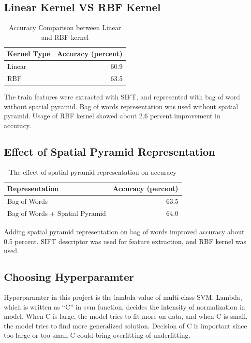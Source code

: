 \subsection*{Linear Kernel VS RBF Kernel}
\begin{table}[h]
    \centering
    \begin{tabular}{lr}
        \toprule
        Kernel Type & Accuracy (percent) \\
        \midrule
        Linear & 60.9 \\
        RBF & 63.5 \\
        \bottomrule
    \end{tabular}
    \caption{Accuracy Comparison between Linear and RBF kernel}
\end{table}
The train features were extracted with SIFT, and represented with bag of word without spatial pyramid. Bag of words representation was used without spatial pyramid. Usage of RBF kernel showed about 2.6 percent improvement in accuracy. 
\subsection*{Effect of Spatial Pyramid Representation}
\begin{table}[h]
    \centering
    \begin{tabular}{lr}
        \toprule
        Representation & Accuracy (percent) \\
        \midrule
        Bag of Words & 63.5 \\
        Bag of Words + Spatial Pyramid & 64.0 \\
        \bottomrule
    \end{tabular}
    \caption{The effect of spatial pyramid representation on accuracy}
\end{table}
Adding spatial pyramid representation on bag of words improved accuracy about 0.5 percent. SIFT descriptor was used for feature extraction, and RBF kernel was used.
\subsection*{Choosing Hyperparamter}
Hyperparamter in this project is the lambda value of multi-class SVM. Lambda, which is written as ``C'' in svm function, decides the intensity of normalization in model. When C is large, the model tries to fit more on data, and when C is small, the model tries to find more generalized solution. Decision of C is important since too large or too small C could bring overfitting of underfitting. 

